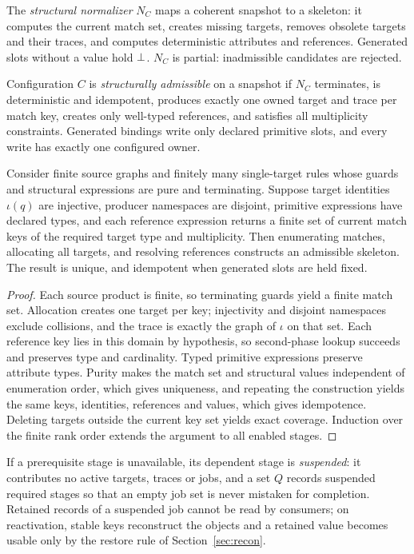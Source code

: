 The \emph{structural normalizer} $N_C$ maps a coherent snapshot to a skeleton: it computes the current match set, creates missing targets, removes obsolete targets and their traces, and computes deterministic attributes and references. Generated slots without a value hold $\bot$. $N_C$ is partial: inadmissible candidates are rejected.

\begin{definition}\label{def:struct}
Configuration $C$ is \emph{structurally admissible} on a snapshot if $N_C$ terminates, is deterministic and idempotent, produces exactly one owned target and trace per match key, creates only well-typed references, and satisfies all multiplicity constraints. Generated bindings write only declared primitive slots, and every write has exactly one configured owner.
\end{definition}

\begin{theorem}\label{thm:kernel}
Consider finite source graphs and finitely many single-target rules whose guards and structural expressions are pure and terminating. Suppose target identities $\iota(q)$ are injective, producer namespaces are disjoint, primitive expressions have declared types, and each reference expression returns a finite set of current match keys of the required target type and multiplicity. Then enumerating matches, allocating all targets, and resolving references constructs an admissible skeleton. The result is unique, and idempotent when generated slots are held fixed.
\end{theorem}
\begin{proof}
Each source product is finite, so terminating guards yield a finite match set. Allocation creates one target per key; injectivity and disjoint namespaces exclude collisions, and the trace is exactly the graph of $\iota$ on that set. Each reference key lies in this domain by hypothesis, so second-phase lookup succeeds and preserves type and cardinality. Typed primitive expressions preserve attribute types. Purity makes the match set and structural values independent of enumeration order, which gives uniqueness, and repeating the construction yields the same keys, identities, references and values, which gives idempotence. Deleting targets outside the current key set yields exact coverage. Induction over the finite rank order extends the argument to all enabled stages.
\end{proof}

If a prerequisite stage is unavailable, its dependent stage is \emph{suspended}: it contributes no active targets, traces or jobs, and a set $Q$ records suspended required stages so that an empty job set is never mistaken for completion. Retained records of a suspended job cannot be read by consumers; on reactivation, stable keys reconstruct the objects and a retained value becomes usable only by the restore rule of Section~\ref{sec:recon}.

